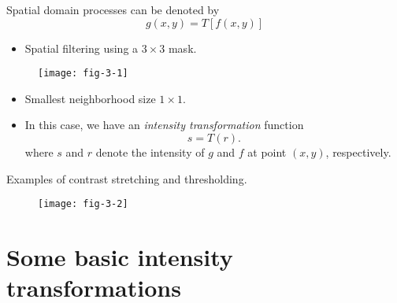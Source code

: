 
\begin{frame}
Spatial domain processes can be denoted by
\begin{equation}
g(x,y) = T\left [f(x,y)\right ]
\end{equation}
\begin{itemize}
\item Spatial filtering using a $3\times 3$ mask.
\end{itemize}
\begin{figure}
\centering
\texttt{[image: fig-3-1]}
\end{figure}
\end{frame}


\begin{frame}
\begin{itemize}
\item Smallest neighborhood size $1\times 1$.
\item In this case, we have an \textit{intensity transformation} function
\begin{equation}
s = T(r).
\end{equation}
where $s$ and $r$ denote the intensity of $g$ and $f$ at point $(x,y)$, respectively.
\end{itemize}
\end{frame}


\begin{frame}
Examples of contrast stretching and thresholding.
\begin{figure}
\centering
\texttt{[image: fig-3-2]}
\end{figure}
\end{frame}


\section{Some basic intensity transformations}


